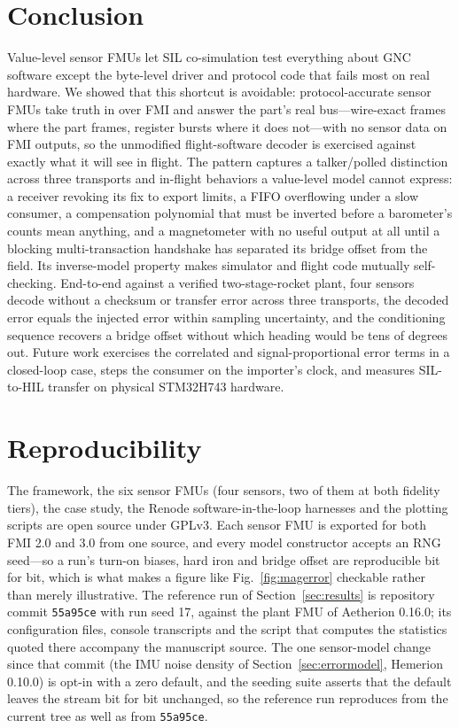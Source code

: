 \documentclass[preprint,12pt,a4paper]{elsarticle}
\newcommand{\code}[1]{\texttt{\small #1}}
\begin{document}
\section{Conclusion}
Value-level sensor FMUs let SIL co-simulation test everything about GNC software
except the byte-level driver and protocol code that fails most on real hardware.
We showed that this shortcut is avoidable: protocol-accurate sensor FMUs take
truth in over FMI and answer the part's real bus---wire-exact frames where the
part frames, register bursts where it does not---with no sensor data on FMI
outputs, so the
unmodified flight-software decoder is exercised against exactly what it will see
in flight. The pattern captures a talker/polled distinction across three
transports and in-flight behaviors a value-level model cannot express: a
receiver revoking its fix to export limits, a FIFO overflowing under a slow
consumer, a compensation polynomial that must be inverted before a barometer's
counts mean anything, and a magnetometer with no useful output at all until a
blocking multi-transaction handshake has separated its bridge offset from the
field. Its inverse-model property makes simulator and flight code mutually
self-checking. End-to-end against a verified two-stage-rocket plant, four
sensors decode without a checksum or transfer error across three transports,
the decoded error equals the injected error within sampling uncertainty, and
the conditioning sequence recovers a bridge offset without which heading would
be tens of degrees out. Future work exercises the
correlated and signal-proportional error terms in a closed-loop case, steps the
consumer on the importer's clock, and measures SIL-to-HIL transfer on physical
STM32H743 hardware.

\section*{Reproducibility}
The framework, the six sensor FMUs (four sensors, two of them at both
fidelity tiers), the case study, the Renode software-in-the-loop harnesses and
the plotting scripts are open source under GPLv3. Each sensor FMU is exported
for both FMI 2.0 and 3.0 from one source, and every model constructor accepts an
RNG seed---so a run's turn-on biases, hard iron and bridge offset are
reproducible bit for bit, which is what makes a figure like
Fig.~\ref{fig:magerror} checkable rather than merely illustrative. The
reference run of Section~\ref{sec:results} is repository commit
\code{55a95ce} with run seed 17, against the plant FMU of Aetherion 0.16.0;
its configuration files, console transcripts and the script that computes the
statistics quoted there accompany the manuscript source. The one sensor-model
change since that commit (the IMU noise density of Section~\ref{sec:errormodel},
Hemerion 0.10.0) is opt-in with a zero default, and the seeding suite asserts
that the default leaves the stream bit for bit unchanged, so the reference run
reproduces from the current tree as well as from \code{55a95ce}.
\end{document}
